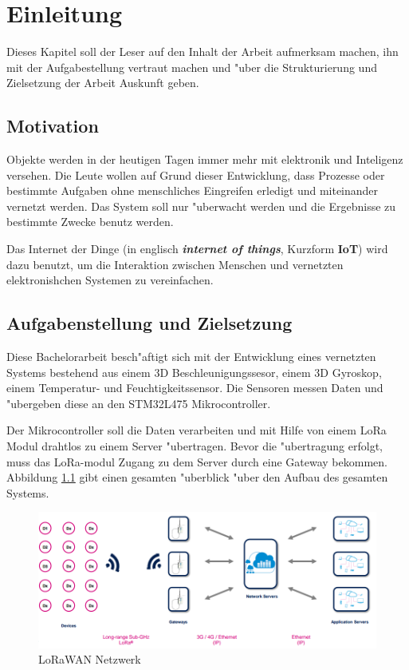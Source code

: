 \chapter{Einleitung}

Dieses Kapitel soll der Leser auf den Inhalt der Arbeit aufmerksam machen, ihn mit der Aufgabestellung vertraut machen und "uber die Strukturierung und Zielsetzung der Arbeit Auskunft geben.


\section{Motivation}
Objekte werden in der heutigen Tagen immer mehr mit elektronik und Inteligenz versehen. Die Leute wollen auf Grund dieser Entwicklung, dass Prozesse oder bestimmte Aufgaben ohne menschliches Eingreifen erledigt und miteinander vernetzt werden. Das System soll nur "uberwacht werden und die Ergebnisse zu bestimmte Zwecke benutz werden.

Das Internet der Dinge (in englisch \textbf{\textit{internet of things}}, Kurzform \textbf{IoT}) wird dazu benutzt, um die Interaktion zwischen Menschen und vernetzten elektronishchen Systemen zu vereinfachen.  


\section{Aufgabenstellung und Zielsetzung}
Diese Bachelorarbeit besch"aftigt sich mit der Entwicklung eines vernetzten Systems bestehend aus einem 3D Beschleunigungssesor, einem 3D Gyroskop, einem Temperatur- und Feuchtigkeitssensor. Die Sensoren messen Daten und "ubergeben diese an den STM32L475 Mikrocontroller.

Der Mikrocontroller soll die Daten verarbeiten und mit Hilfe von einem LoRa Modul drahtlos zu einem Server "ubertragen. Bevor die "ubertragung erfolgt, muss das LoRa-modul Zugang zu dem Server durch eine Gateway bekommen. Abbildung \ref{LRWAN} gibt einen gesamten "uberblick "uber den Aufbau des gesamten  Systems.

\begin{figure}[h]	
	\includegraphics[width=17cm]{source/images/LoRaWAN}
	\caption{LoRaWAN Netzwerk}\label{LRWAN}
\end{figure}

